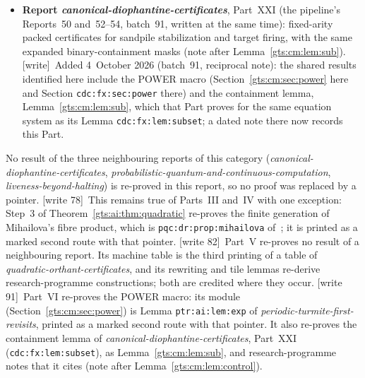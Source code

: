 \documentclass[11pt,letterpaper]{article}
\theoremstyle{definition}
\theoremstyle{remark}
\newcommand{\wtag}{\textup{[write]}}
\newcommand{\wtagb}{\textup{[write 78]}}
\newcommand{\wtagc}{\textup{[write 82]}}
\newcommand{\wtagd}{\textup{[write 91]}}
\begin{document}
\begin{itemize}
\item \textbf{Report \emph{canonical-diophantine-certificates}}, Part~XXI (the pipeline's Reports~50 and~52--54, batch~91, written at the same time): fixed-arity packed certificates for sandpile stabilization and target firing, with the same expanded binary-containment masks (note after Lemma~\ref{gts:cm:lem:sub}). \wtag\ Added 4~October 2026 (batch~91, reciprocal note): the shared results identified here include the POWER macro (Section~\ref{gts:cm:sec:power} here and Section \texttt{cdc:fx:sec:power} there) and the containment lemma, Lemma~\ref{gts:cm:lem:sub}, which that Part proves for the same equation system as its Lemma \texttt{cdc:fx:lem:subset}; a dated note there now records this Part.
\end{itemize}

No result of the three neighbouring reports of this category (\emph{canonical-diophantine-certificates}, \emph{probabilistic-quantum-and-continuous-computation}, \emph{liveness-beyond-halting}) is re-proved in this report, so no proof was replaced by a pointer. \wtagb\ This remains true of Parts~III and~IV with one exception: Step~3 of Theorem~\ref{gts:ai:thm:quadratic} re-proves the finite generation of Mihailova's fibre product, which is \texttt{pqc:dr:prop:mihailova} of~\cite{pqc}; it is printed as a marked second route with that pointer. \wtagc\ Part~V re-proves no result of a neighbouring report. Its machine table is the third printing of a table of \emph{quadratic-orthant-certificates}, and its rewriting and tile lemmas re-derive research-programme constructions; both are credited where they occur. \wtagd\ Part~VI re-proves the POWER macro: its module (Section~\ref{gts:cm:sec:power}) is Lemma \texttt{ptr:ai:lem:exp} of \emph{periodic-turmite-first-revisits}, printed as a marked second route with that pointer. It also re-proves the containment lemma of \emph{canonical-diophantine-certificates}, Part~XXI (\texttt{cdc:fx:lem:subset}), as Lemma~\ref{gts:cm:lem:sub}, and research-programme notes that it cites (note after Lemma~\ref{gts:cm:lem:control}).
\end{document}

